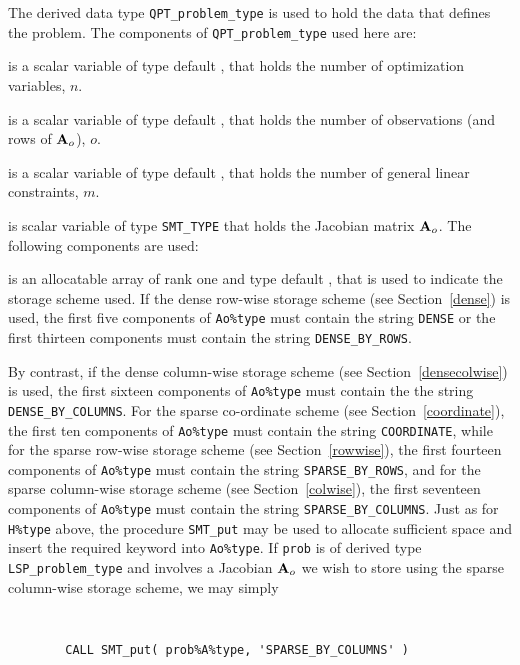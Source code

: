 \documentclass{galahad}
\newcommand{\packagename}{LSP}
\begin{document}
The derived data type
{\tt QPT\_problem\_type}
is used to hold the data that defines the problem.
The components of
{\tt QPT\_problem\_type} used here are:

\begin{description}

 is a scalar variable of type default \integer,
 that holds the number of optimization variables, $n$.

 is a scalar variable of type default \integer,
 that holds the number of observations (and rows of ${\mathbf{A}}_o$), $o$.

 is a scalar variable of type default \integer,
 that holds the number of general linear constraints, $m$.

 is scalar variable of type {\tt SMT\_TYPE}
that holds the Jacobian matrix ${\mathbf{A}}_o$. The following components are used:

\begin{description}

 is an allocatable array of rank one and type default \character,
that is used to indicate the storage scheme used. If the dense row-wise
storage scheme (see Section~\ref{dense}) is used,
the first five components of {\tt Ao\%type} must contain the
string {\tt DENSE} or the first thirteen components must contain the
string {\tt DENSE\_BY\_ROWS}.

By contrast, if the dense column-wise storage scheme
(see Section~\ref{densecolwise}) is used,
the first sixteen components of {\tt Ao\%type} must contain the
the string {\tt DENSE\_BY\_COLUMNS}.
For the sparse co-ordinate scheme (see Section~\ref{coordinate}),
the first ten components of {\tt Ao\%type} must contain the
string {\tt COORDINATE}, while
for the sparse row-wise storage scheme (see Section~\ref{rowwise}),
the first fourteen components of {\tt Ao\%type} must contain the
string {\tt SPARSE\_BY\_ROWS},
and for the sparse column-wise storage scheme (see Section~\ref{colwise}),
the first seventeen components of {\tt Ao\%type} must contain the
string {\tt SPARSE\_BY\_COLUMNS}.
Just as for {\tt H\%type} above, the procedure {\tt SMT\_put}
may be used to allocate sufficient space and insert the required keyword
into {\tt Ao\%type}.
If {\tt prob} is of derived type {\tt \packagename\_problem\_type}
and involves a Jacobian ${\mathbf{A}}_o$ we wish to store using the sparse column-wise
storage scheme, we may simply
{\tt
\begin{verbatim}
        CALL SMT_put( prob%A%type, 'SPARSE_BY_COLUMNS' )
\end{verbatim}
}
\noindent


\end{description}
\end{description}
\end{document}
